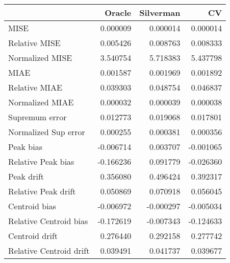 \begin{tabular}{lrrr}
  \toprule
 & Oracle & Silverman & CV \\ 
  \midrule
MISE & 0.000009 & 0.000014 & 0.000014 \\ 
  Relative MISE & 0.005426 & 0.008763 & 0.008333 \\ 
  Normalized MISE & 3.540754 & 5.718383 & 5.437798 \\ 
  MIAE & 0.001587 & 0.001969 & 0.001892 \\ 
  Relative MIAE & 0.039303 & 0.048754 & 0.046837 \\ 
  Normalized MIAE & 0.000032 & 0.000039 & 0.000038 \\ 
  Supremum error & 0.012773 & 0.019068 & 0.017801 \\ 
  Normalized Sup error & 0.000255 & 0.000381 & 0.000356 \\ 
  Peak bias & -0.006714 & 0.003707 & -0.001065 \\ 
  Relative Peak bias & -0.166236 & 0.091779 & -0.026360 \\ 
  Peak drift & 0.356080 & 0.496424 & 0.392317 \\ 
  Relative Peak drift & 0.050869 & 0.070918 & 0.056045 \\ 
  Centroid bias & -0.006972 & -0.000297 & -0.005034 \\ 
  Relative Centroid bias & -0.172619 & -0.007343 & -0.124633 \\ 
  Centroid drift & 0.276440 & 0.292158 & 0.277742 \\ 
  Relative Centroid drift & 0.039491 & 0.041737 & 0.039677 \\ 
   \bottomrule
\end{tabular}
